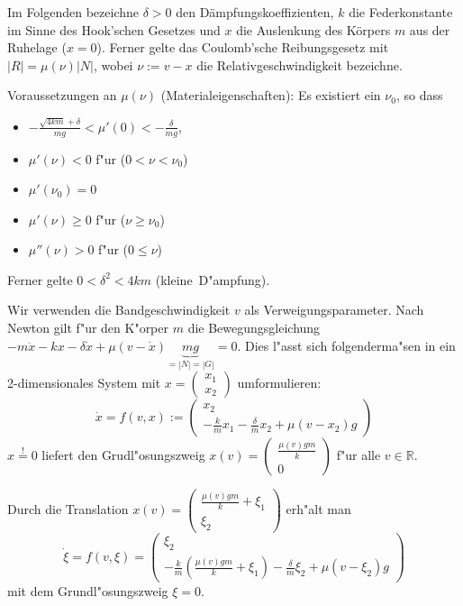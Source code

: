 \documentclass[a4paper, 13pt]{scrreprt}
\theoremstyle{definition} \newtheorem{definition}{Definition}[section]
\newenvironment{beispiel}[1][Beispiel]{\begin{trivlist}
\item[\hskip \labelsep {\bfseries #1}]}{\end{trivlist}}
\newcommand{\RR}{\mathbb{R}}
\begin{document}
\begin{beispiel}[Reibschwinger aus der Mechanik]
Im Folgenden bezeichne $\delta>0$ den Dämpfungskoeffizienten, $k$ die Federkonstante im Sinne des Hook'schen Gesetzes und $x$ die Auslenkung des Körpers $m$ aus der Ruhelage ($x=0$). Ferner gelte das Coulomb'sche Reibungsgesetz mit $|R|=\mu(\nu)|N|$, wobei $\nu:=v-x$ die Relativgeschwindigkeit bezeichne.

Voraussetzungen an $\mu(\nu)$ (Materialeigenschaften): Es existiert ein $\nu_0$, so dass
\begin{itemize}
\item
$-\frac{\sqrt{4km}+\delta}{mg}<\mu'(0)<-\frac{\delta}{mg}$,
\item
$\mu'(\nu)<0$ f"ur ($0<\nu<\nu_0$)
\item
$\mu'(\nu_0)=0$
\item
$\mu'(\nu)\geq0$ f"ur ($\nu\geq\nu_0$)
\item
$\mu''(\nu)>0$ f"ur ($0\leq\nu$)
\end{itemize}

Ferner gelte $0<\delta^2<4km$ (\glqq kleine\grqq\ D"ampfung).

Wir verwenden die Bandgeschwindigkeit $v$ als Verweigungsparameter. Nach Newton gilt f"ur den K"orper $m$ die Bewegungsgleichung $-m\ddot{x}-kx-\delta\dot{x}+\mu(v-\dot{x})\underbrace{mg}_{=|N|=|G|}=0$. Dies l"asst sich folgenderma"sen in ein 2-dimensionales System mit $x=\begin{pmatrix} x_1\\ x_2\end{pmatrix}$ umformulieren:
\[
\dot{x}=f(v,x):=\begin{pmatrix}
x_2\\
-\frac{k}{m}x_1-\frac{\delta}{m}x_2+\mu(v-x_2)g
\end{pmatrix}
\]
$x\stackrel{!}{=}0$ liefert den Grudl"osungszweig $x(v)=\begin{pmatrix}
\frac{\mu(v)gm}{k}\\
0
\end{pmatrix}$ f"ur alle $v\in\RR$.

Durch die Translation $x(v)=\begin{pmatrix}
\frac{\mu(v)gm}{k}+\xi_1\\
\xi_2
\end{pmatrix}$ erh"alt man 
\[
\dot{\xi}=f(v,\xi)=\begin{pmatrix}
\xi_2\\
-\frac{k}{m}(\frac{\mu(v)gm}{k}+\xi_1)-\frac{\delta}{m}\xi_2+\mu(v-\xi_2)g
\end{pmatrix}
\]
mit dem Grundl"osungszweig $\xi=0$.


\end{beispiel}
\end{document}
